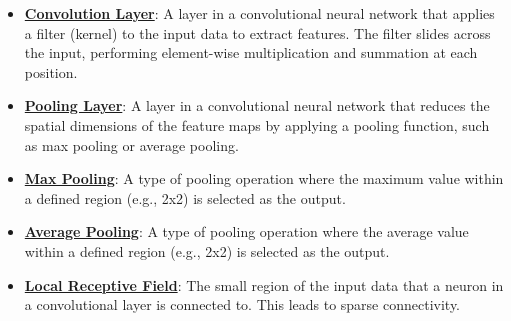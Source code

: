 \documentclass{article}%
\begin{document}
\begin{itemize}[leftmargin=*]
\item \href{https://purdue.brightspace.com/d2l/common/assets/pdfjs-d2l-dist/1.0.14-legacy/web/viewer.html?file=\%2Fcontent\%2Fenforced\%2F1095467-wl.202510.CS.24300.001\%2F09L1-cnn.pdf\%3Fou\%3D1095467\&lang=en-us\&container=d2l-fileviewer-rendered-pdf\&fullscreen=d2l-fileviewer-rendered-pdf-dialog\&height=667#page=6}{\textbf{Convolution Layer}}: A layer in a convolutional neural network that applies a filter (kernel) to the input data to extract features. The filter slides across the input, performing element-wise multiplication and summation at each position.%
\item \href{https://purdue.brightspace.com/d2l/common/assets/pdfjs-d2l-dist/1.0.14-legacy/web/viewer.html?file=\%2Fcontent\%2Fenforced\%2F1095467-wl.202510.CS.24300.001\%2F09L1-cnn.pdf\%3Fou\%3D1095467\&lang=en-us\&container=d2l-fileviewer-rendered-pdf\&fullscreen=d2l-fileviewer-rendered-pdf-dialog\&height=667#page=6}{\textbf{Pooling Layer}}: A layer in a convolutional neural network that reduces the spatial dimensions of the feature maps by applying a pooling function, such as max pooling or average pooling.%
\item \href{https://purdue.brightspace.com/d2l/common/assets/pdfjs-d2l-dist/1.0.14-legacy/web/viewer.html?file=\%2Fcontent\%2Fenforced\%2F1095467-wl.202510.CS.24300.001\%2F09L1-cnn.pdf\%3Fou\%3D1095467\&lang=en-us\&container=d2l-fileviewer-rendered-pdf\&fullscreen=d2l-fileviewer-rendered-pdf-dialog\&height=667#page=15}{\textbf{Max Pooling}}: A type of pooling operation where the maximum value within a defined region (e.g., 2x2) is selected as the output.%
\item \href{https://purdue.brightspace.com/d2l/common/assets/pdfjs-d2l-dist/1.0.14-legacy/web/viewer.html?file=\%2Fcontent\%2Fenforced\%2F1095467-wl.202510.CS.24300.001\%2F09L1-cnn.pdf\%3Fou\%3D1095467\&lang=en-us\&container=d2l-fileviewer-rendered-pdf\&fullscreen=d2l-fileviewer-rendered-pdf-dialog\&height=667#page=15}{\textbf{Average Pooling}}: A type of pooling operation where the average value within a defined region (e.g., 2x2) is selected as the output.%
\item \href{https://purdue.brightspace.com/d2l/common/assets/pdfjs-d2l-dist/1.0.14-legacy/web/viewer.html?file=\%2Fcontent\%2Fenforced\%2F1095467-wl.202510.CS.24300.001\%2F09L1-cnn.pdf\%3Fou\%3D1095467\&lang=en-us\&container=d2l-fileviewer-rendered-pdf\&fullscreen=d2l-fileviewer-rendered-pdf-dialog\&height=667#page=10}{\textbf{Local Receptive Field}}: The small region of the input data that a neuron in a convolutional layer is connected to. This leads to sparse connectivity.%

\end{itemize}
\end{document}
